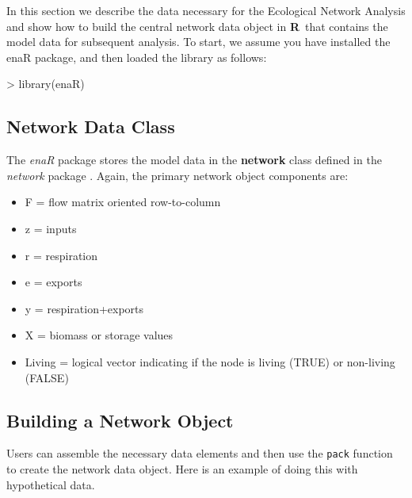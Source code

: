 \documentclass[article]{jss}
\newcommand{\R}{\textbf{R}}
\begin{document}
In this section we describe the data necessary for the Ecological
Network Analysis and show how to build the central network data object
in \R\ that contains the model data for subsequent analysis.  To
start, we assume you have installed the enaR package, and then loaded
the library as follows:

\begin{Schunk}
\begin{Sinput}
> library(enaR)
\end{Sinput}
\end{Schunk}







\subsection{Network Data Class}

The \textit{enaR} package stores the model data in the \textbf{network}
class defined in the \textit{network} package \citep[see][for
details]{butts08_network}. Again, the primary network object
components are:

\begin{itemize}
\item F = flow matrix oriented row-to-column
\item z = inputs
\item r = respiration
\item e = exports
\item y = respiration+exports
\item X = biomass or storage values
\item Living = logical vector indicating if the node is living
  (TRUE) or non-living (FALSE)
\end{itemize}

\subsection{Building a Network Object}

Users can assemble the necessary data elements and then use the
\texttt{pack} function to create the network data object.  Here is an
example of doing this with hypothetical data.
\end{document}
